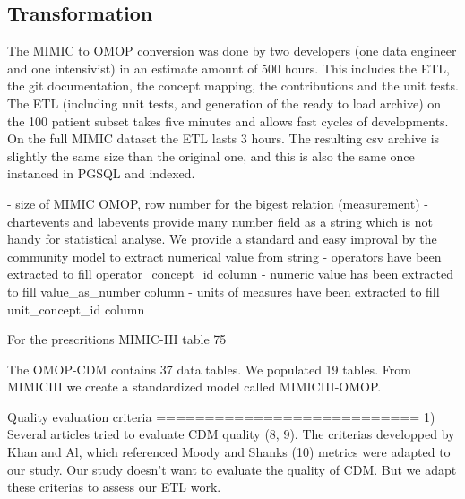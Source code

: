 \subsection{Transformation}

The MIMIC to OMOP conversion was done by two developers (one data engineer and
one intensivist) in an estimate amount of 500 hours. This includes the ETL, the
git documentation, the concept mapping, the contributions and the unit tests.
The ETL (including unit tests, and generation of the ready to load archive) on
the 100 patient subset takes five minutes and allows fast cycles of
developments. On the full MIMIC dataset the ETL lasts 3 hours. 
The resulting csv archive is slightly the same size than the original one, and
this is also the same once instanced in PGSQL and indexed.


- size of MIMIC OMOP, row number for the bigest relation (measurement)
- chartevents and labevents provide many number field as a string which is not handy for statistical analyse. We provide a standard and easy improval by the community model to extract numerical value from string
	- operators have been extracted to fill operator_concept_id column
	- numeric value has been extracted to fill value_as_number column
	- units of measures have been extracted to fill unit_concept_id column

  For the prescritions MIMIC-III table 75%

The OMOP-CDM contains 37 data tables. We populated 19 tables.
From MIMICIII we create a standardized model called MIMICIII-OMOP.

Quality evaluation criteria
===========================
1)
Several articles tried to evaluate CDM quality (8, 9).
The criterias developped by Khan and Al, which referenced Moody and Shanks (10) metrics were adapted to our study.
Our study doesn't want to evaluate the quality of CDM. But we adapt these criterias to assess our ETL work.

